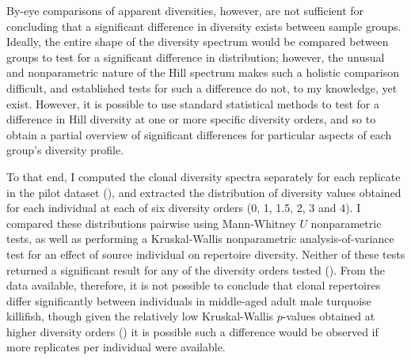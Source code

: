 By-eye comparisons of apparent diversities, however, are not sufficient for concluding that a significant difference in diversity exists between sample groups. Ideally, the entire shape of the diversity spectrum would be compared between groups to test for a significant difference in distribution; however, the unusual and nonparametric nature of the Hill spectrum makes such a holistic comparison difficult, and established tests for such a difference do not, to my knowledge, yet exist. However, it is possible to use standard statistical methods to test for a difference in Hill diversity at one or more specific diversity orders, and so to obtain a partial overview of significant differences for particular aspects of each group's diversity profile. 

To that end, I computed the clonal diversity spectra separately for each replicate in the pilot dataset (), and extracted the distribution of diversity values obtained for each individual at each of six diversity orders (0, 1, 1.5, 2, 3 and 4). I compared these distributions pairwise using Mann-Whitney $U$ nonparametric tests, as well as performing a Kruskal-Wallis nonparametric analysis-of-variance test for an effect of source individual on repertoire diversity. Neither of these tests returned a significant result for any of the diversity orders tested (). From the data available, therefore, it is not possible to conclude that clonal repertoires differ significantly between individuals in middle-aged adult male turquoise killifish, though given the relatively low Kruskal-Wallis $p$-values obtained at higher diversity orders () it is possible such a difference would be observed if more replicates per individual were available.

